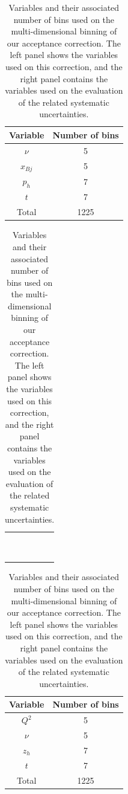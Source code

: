 \begin{table}[htbp]
  \centering
  \begin{tabular}{@{} cc @{}}
    \hline
    Variable & Number of bins \\ 
    \hline
    $\nu$    & 5 \\
    $x_{Bj}$ & 5 \\
    $p_h$    & 7 \\
    $t$      & 7 \\
    \hline
    Total    & 1225 \\
    \hline
  \end{tabular}
  \begin{tabular}{@{} c @{}}
  ~~~~~~\\
  ~~~~~~\\
  \end{tabular}
  \begin{tabular}{@{} cc @{}}
    \hline
    Variable & Number of bins \\ 
    \hline
    $Q^2$    & 5 \\
    $\nu$    & 5 \\
    $z_h$    & 7 \\
    $t$      & 7 \\
    \hline
    Total    & 1225 \\
    \hline
  \end{tabular}
  \caption{Variables and their associated number of bins used on the 
   multi-dimensional binning of our acceptance correction. The left panel 
   shows the variables used on this correction, and the right panel contains the 
   variables used on the evaluation of the related systematic uncertainties.}
  \label{tab:AcceptBinning}
\end{table}

